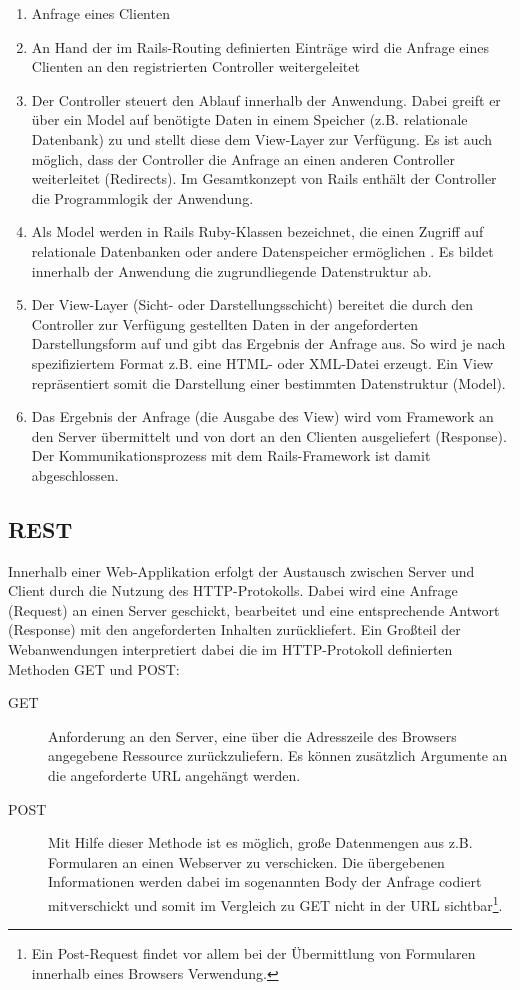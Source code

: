 \begin{enumerate}
\item
Anfrage eines Clienten
\item
An Hand der im Rails-Routing definierten Einträge wird die Anfrage eines Clienten an den registrierten Controller weitergeleitet
\item
Der Controller steuert den Ablauf innerhalb der Anwendung. Dabei greift er über ein Model auf benötigte Daten in einem Speicher (z.B. relationale Datenbank) zu und stellt diese dem View-Layer zur Verfügung. Es ist auch möglich, dass der Controller die Anfrage an einen anderen Controller weiterleitet (Redirects). Im Gesamtkonzept von Rails enthält der Controller die Programmlogik der Anwendung.
\item
Als Model werden in Rails Ruby-Klassen bezeichnet, die einen Zugriff auf relationale Datenbanken oder andere Datenspeicher ermöglichen \citep[vgl.][]{Rails2}. Es bildet innerhalb der Anwendung die zugrundliegende Datenstruktur ab.
\item
Der View-Layer (Sicht- oder Darstellungsschicht) bereitet die durch den Controller zur Verfügung gestellten Daten in der angeforderten Darstellungsform auf und gibt das Ergebnis der Anfrage aus. So wird je nach spezifiziertem Format z.B. eine HTML- oder XML-Datei erzeugt. Ein View repräsentiert somit die Darstellung einer bestimmten Datenstruktur (Model).
\item
Das Ergebnis der Anfrage (die Ausgabe des View) wird vom Framework an den Server übermittelt und von dort an den Clienten ausgeliefert (Response). Der Kommunikationsprozess mit dem Rails-Framework ist damit abgeschlossen.
\end{enumerate}



\subsection{REST}
\label{grundrest}
Innerhalb einer Web-Applikation erfolgt der Austausch zwischen Server und Client durch die Nutzung des HTTP-Protokolls. Dabei wird eine Anfrage (Request) an einen Server geschickt, bearbeitet und eine entsprechende Antwort (Response) mit den angeforderten Inhalten zurückliefert. Ein Großteil der Webanwendungen interpretiert dabei die im HTTP-Protokoll definierten Methoden GET und POST:

\begin{description}
\item[GET]
Anforderung an den Server, eine über die Adresszeile des Browsers angegebene Ressource zurückzuliefern. Es können zusätzlich Argumente an die angeforderte URL angehängt werden.
\item[POST]
Mit Hilfe dieser Methode ist es möglich, große Datenmengen aus z.B. Formularen an einen Webserver zu verschicken. Die übergebenen Informationen werden dabei im sogenannten Body der Anfrage codiert mitverschickt und somit im Vergleich zu GET nicht in der URL sichtbar\footnote{Ein Post-Request findet vor allem bei der Übermittlung von Formularen innerhalb eines Browsers Verwendung.}.
\end{description}


